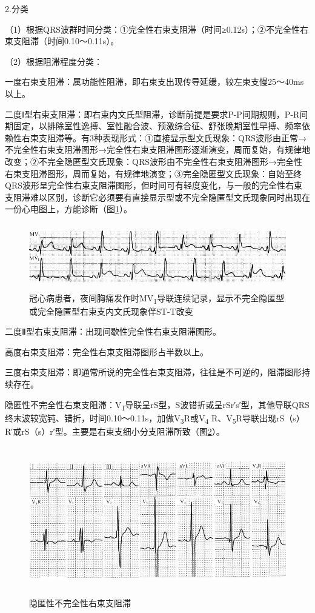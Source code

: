 2.分类

（1）根据QRS波群时间分类：①完全性右束支阻滞（时间≥0.12s）；②不完全性右束支阻滞（时间0.10～0.11s）。

（2）根据阻滞程度分类：

一度右束支阻滞：属功能性阻滞，即右束支出现传导延缓，较左束支慢25～40ms以上。

二度Ⅰ型右束支阻滞：即右束内文氏型阻滞，诊断前提是要求P-P间期规则，P-R间期固定，以排除室性逸搏、室性融合波、预激综合征、舒张晚期室性早搏、频率依赖性右束支阻滞等。有3种表现形式：①直接显示型文氏现象：QRS波形由正常→不完全性右束支阻滞图形→完全性右束支阻滞图形逐渐演变，周而复始，有规律地改变；②不完全隐匿型文氏现象：QRS波形由不完全性右束支阻滞图形→完全性右束支阻滞图形，周而复始，有规律地演变；③完全隐匿型文氏现象：自始至终QRS波形呈完全性右束支阻滞图形，但时间可有轻度变化，与一般的完全性右束支阻滞难以区别，诊断它必须要有直接显示型或不完全隐匿型文氏现象同时出现在一份心电图上，方能诊断（图\ref{fig21-5}）。

\begin{figure}[!htbp]
 \centering
 \includegraphics[width=5.58333in,height=1.125in]{./images/Image00353.jpg}
 \captionsetup{justification=centering}
 \caption{冠心病患者，夜间胸痛发作时MV\textsubscript{1}导联连续记录，显示不完全隐匿型或完全隐匿型右束支内文氏现象伴ST-T改变}
 \label{fig21-5}
  \end{figure} 


二度Ⅱ型右束支阻滞：出现间歇性完全性右束支阻滞图形。

高度右束支阻滞：完全性右束支阻滞图形占半数以上。

三度右束支阻滞：即通常所说的完全性右束支阻滞，往往是不可逆的，阻滞图形持续存在。

隐匿性不完全性右束支阻滞：V\textsubscript{1}导联呈rS型，S波错折或呈rSr′s′型，其他导联QRS终末波较宽钝、错折，时间0.10～0.11s，加做V\textsubscript{3}R或V\textsubscript{4} R、V\textsubscript{5}R导联出现rS（s）R′或rS（s）r′型。主要是右束支细小分支阻滞所致（图\ref{fig21-6}）。

\begin{figure}[!htbp]
 \centering
 \includegraphics[width=5.60417in,height=2.55208in]{./images/Image00354.jpg}
 \captionsetup{justification=centering}
 \caption{隐匿性不完全性右束支阻滞}
 \label{fig21-6}
  \end{figure} 

